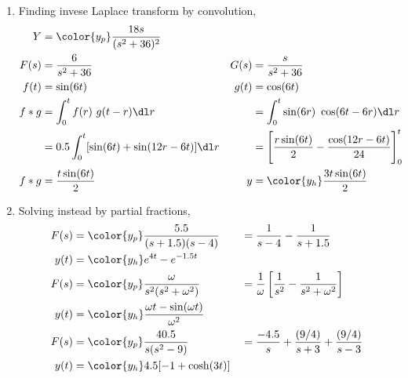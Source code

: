 \begin{enumerate}
    \item Finding invese Laplace transform by convolution,
          \begin{align}
              Y     & = \color{y_p} \frac{18s}{(s^2 + 36)^2}                     \\
              F(s)  & = \frac{6}{s^2 + 36}                                     &
              G(s)  & = \frac{s}{s^2 + 36}                                       \\
              f(t)  & = \sin(6t)                                               &
              g(t)  & = \cos(6t)                                                 \\
              f * g & = \int_{0}^{t} f(r)\ g(t-r) \dl r                        &
                    & = \int_{0}^{t} \sin(6r)\ \cos(6t - 6r) \dl r               \\
                    & = 0.5\int_{0}^{t} [\sin(6t) + \sin(12r - 6t)] \dl r      &
                    & = \Bigg[ \frac{r\sin(6t)}{2} - \frac{\cos(12r - 6t)}{24}
              \Bigg]_0^t                                                         \\
              f * g & = \frac{t \sin(6t)}{2}                                   &
              y     & = \color{y_h} \frac{3t\sin(6t)}{2}
          \end{align}

    \item Solving instead by partial fractions,
          \begin{align}
              F(s) & = \color{y_p} \frac{5.5}{(s + 1.5)(s - 4)}               &
                   & = \frac{1}{s - 4} - \frac{1}{s + 1.5}                      \\
              y(t) & = \color{y_h} e^{4t} - e^{-1.5t}                           \\
              F(s) & = \color{y_p} \frac{\omega}{s^2(s^2 + \omega^2)}         &
                   & = \frac{1}{\omega} \left[ \frac{1}{s^2}
              - \frac{1}{s^2 + \omega^2} \right]                                \\
              y(t) & = \color{y_h} \frac{\omega t - \sin(\omega t)}{\omega^2}   \\
              F(s) & = \color{y_p} \frac{40.5}{s(s^2 - 9)}                    &
                   & = \frac{-4.5}{s} + \frac{(9/4)}{s + 3} + \frac{(9/4)}
              {s - 3}                                                           \\
              y(t) & = \color{y_h} 4.5[-1 + \cosh(3t)]
          \end{align}
\end{enumerate}